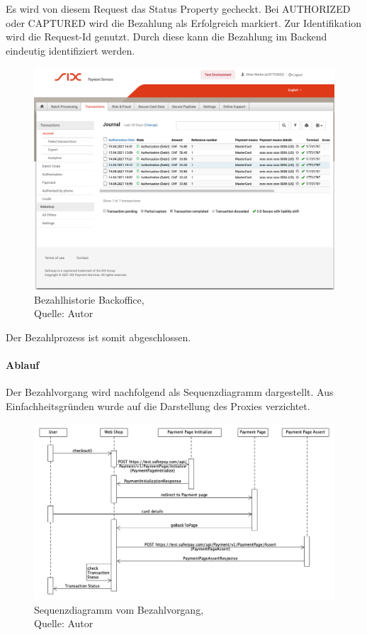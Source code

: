 Es wird von diesem Request das Status Property gecheckt. Bei AUTHORIZED oder CAPTURED wird die Bezahlung als Erfolgreich markiert. 
Zur Identifikation wird die Request-Id genutzt. Durch diese kann die Bezahlung im Backend eindeutig identifiziert werden. 
\begin{figure}[H]
	\centering
	\includegraphics[width=1\textwidth]{images/paymentsBackoffice.PNG}
	\caption[Bezahlhistorie Backoffice]{Bezahlhistorie Backoffice,\\ Quelle: Autor}
	\label{img: paymentsBackoffice}
\end{figure} 

Der Bezahlprozess ist somit abgeschlossen. 

\paragraph{Ablauf}
Der Bezahlvorgang wird nachfolgend als Sequenzdiagramm dargestellt. Aus Einfachheitsgründen wurde auf die Darstellung des Proxies verzichtet. 
\begin{figure}[H]
	\centering
	\includegraphics[width=1\textwidth]{images/paymentSequence.PNG}
	\caption[Sequenzdiagramm vom Bezahlvorgang]{Sequenzdiagramm vom Bezahlvorgang,\\ Quelle: Autor}
	\label{img: paymentSequence}
\end{figure} 

